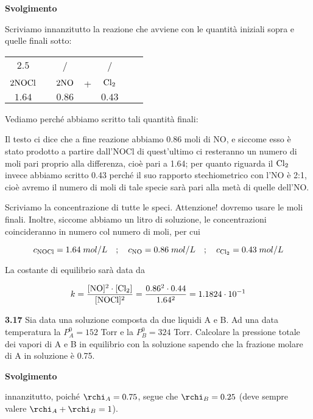 \vspace{0.2cm}\large\textbf{Svolgimento}\normalsize

\vspace{0.2cm}Scriviamo innanzitutto la reazione che avviene con le quantità iniziali sopra e quelle finali sotto: 

\begin{center}
    \begin{tabular}{ccccccc}
        $2.5$ & & / & & /\\
        $\rm 2NOCl$ & \ce{<-->} & $\rm 2NO$ & + & $\rm Cl_2$\\
        $1.64$ & & $0.86$ & & $0.43$\\
    \end{tabular}
\end{center}

Vediamo perché abbiamo scritto tali quantità finali:

Il testo ci dice che a fine reazione abbiamo 0.86 moli di NO, e siccome esso è stato prodotto a partire dall'NOCl di quest'ultimo ci resteranno un numero di moli pari proprio alla differenza, cioè pari a 1.64; per quanto riguarda il $\rm Cl_2$ invece abbiamo scritto 0.43 perché il suo rapporto stechiometrico con l'NO è 2:1, cioè avremo il numero di moli di tale specie sarà pari alla metà di quelle dell'NO.

Scriviamo la concentrazione di tutte le speci. Attenzione! dovremo usare le moli finali. Inoltre, siccome abbiamo un litro di soluzione, le concentrazioni coincideranno in numero col numero di moli, per cui

$$c_{\rm NOCl}=1.64\;mol/L
\quad;\quad
c_{\rm NO}=0.86\;mol/L
\quad;\quad
c_{\rm Cl_2}=0.43\;mol/L$$

La costante di equilibrio sarà data da

$$k=\rm \frac{[NO]^2 \cdot [Cl_2]}{[NOCl]^2}
=\frac{0.86^2 \cdot 0.44}{1.64^2}=1.1824 \cdot 10^{-1}$$

\vspace{0.2cm}\textbf{3.17} Sia data una soluzione composta da due liquidi A e B. Ad una data temperatura la $P^0_A = 152$ Torr
e la $P^0_B = 324$ Torr. Calcolare la pressione totale dei vapori di A e B in equilibrio con la soluzione sapendo che la frazione molare di A in soluzione è 0.75.

\vspace{0.2cm}\large\textbf{Svolgimento}\normalsize

\vspace{0.2cm}innanzitutto, poiché $\rchi_A=0.75$, segue che $\rchi_B=0.25$ (deve sempre valere $\rchi_A + \rchi_B =1$).

